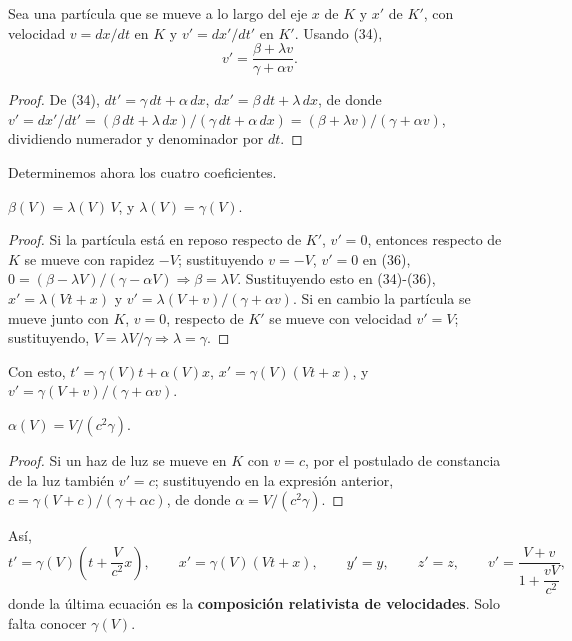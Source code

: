 \begin{proposicionc}
Sea una partícula que se mueve a lo largo del eje $x$ de $K$ y $x'$ de
$K'$, con velocidad $v=dx/dt$ en $K$ y $v'=dx'/dt'$ en $K'$. Usando (34),
\[
v' = \frac{\beta+\lambda v}{\gamma+\alpha v} . \tag{36}
\]
\end{proposicionc}

\begin{proof}
De (34), $dt'=\gamma\,dt+\alpha\,dx$, $dx'=\beta\,dt+\lambda\,dx$, de
donde $v'=dx'/dt' = (\beta\,dt+\lambda\,dx)/(\gamma\,dt+\alpha\,dx) =
(\beta+\lambda v)/(\gamma+\alpha v)$, dividiendo numerador y
denominador por $dt$. \qedhere
\end{proof}

Determinemos ahora los cuatro coeficientes.

\begin{proposicionc}
$\beta(V) = \lambda(V)\,V$, y $\lambda(V)=\gamma(V)$.
\end{proposicionc}

\begin{proof}
Si la partícula está en reposo respecto de $K'$, $v'=0$, entonces
respecto de $K$ se mueve con rapidez $-V$; sustituyendo $v=-V$, $v'=0$
en (36), $0=(\beta-\lambda V)/(\gamma-\alpha V) \Rightarrow
\beta=\lambda V$. Sustituyendo esto en (34)-(36), $x'=\lambda(Vt+x)$ y
$v'=\lambda(V+v)/(\gamma+\alpha v)$. Si en cambio la partícula se mueve
junto con $K$, $v=0$, respecto de $K'$ se mueve con velocidad $v'=V$;
sustituyendo, $V=\lambda V/\gamma \Rightarrow \lambda=\gamma$.
\qedhere
\end{proof}

Con esto, $t'=\gamma(V)t+\alpha(V)x$, $x'=\gamma(V)(Vt+x)$, y
$v'=\gamma(V+v)/(\gamma+\alpha v)$.

\begin{proposicionc}
$\alpha(V) = V/(c^2\gamma)$.
\end{proposicionc}

\begin{proof}
Si un haz de luz se mueve en $K$ con $v=c$, por el postulado de
constancia de la luz también $v'=c$; sustituyendo en la expresión
anterior, $c=\gamma(V+c)/(\gamma+\alpha c)$, de donde
$\alpha=V/(c^2\gamma)$. \qedhere
\end{proof}

Así,
\[
t' = \gamma(V)\left(t+\frac{V}{c^2}x\right), \qquad x' = \gamma(V)(Vt+x),
\qquad y'=y, \qquad z'=z, \qquad v' = \frac{V+v}{1+\dfrac{vV}{c^2}},
\]
donde la última ecuación es la \textbf{composición relativista de
velocidades}. Solo falta conocer $\gamma(V)$.

